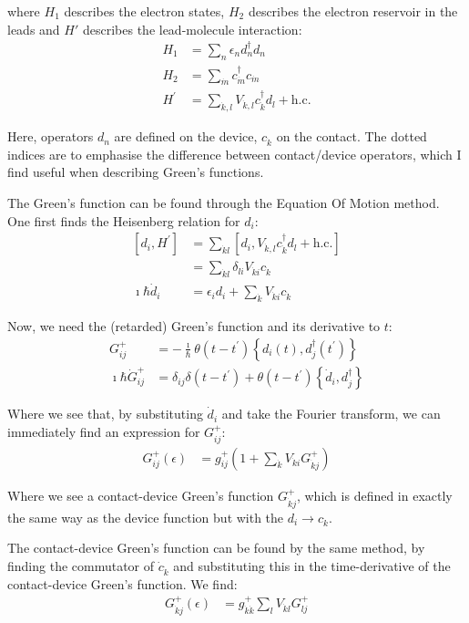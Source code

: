 where $H_1$ describes the electron states, $H_2$ describes the electron reservoir in the leads and $H'$ describes the lead-molecule interaction:
\begin{align*}
H_1 &= \sum_n \epsilon_n d^\dagger_n d_n \\
H_2 &= \sum_{\dot{m}} c^\dagger_{\dot{m}} c_{\dot{m}} \\
H^\prime &= \sum_{\dot{k}, l} V_{\dot{k}, l} c^\dagger_{\dot{k}} d_l + \text{h.c.}
\end{align*}

Here, operators $d_n$ are defined on the device, $c_{\dot{k}}$ on the contact. The dotted indices are to emphasise the difference between contact/device operators, which I find useful when describing Green's functions. 

The Green's function can be found through the Equation Of Motion method. One first finds the Heisenberg relation for $d_i$:
\begin{align*}
\left[ d_i, H^\prime\right] &= \sum_{\dot{k}l}\left[d_i, V_{\dot{k}, l} c^\dagger_{\dot{k}} d_l + \text{h.c.}\right] \\
&= \sum_{\dot{k}l}\delta_{li} V_{\dot{k}i} c_{\dot{k}}\\
\imath\hbar \dot{d}_i &= \epsilon_i d_i + \sum_{\dot{k}}V_{\dot{k}i} c_{\dot{k}}
\end{align*}

Now, we need the (retarded) Green's function and its derivative to $t$:
\begin{align*}
G_{ij}^+ &= - \frac{\imath}{\hbar} \theta(t-t^\prime) \left\{ d_i(t), d_j^\dagger(t^\prime) \right\} \\
\imath\hbar \dot{G}_{ij}^+ &= \delta_{ij} \delta(t - t^\prime) + \theta(t-t^\prime) \left\{ \dot{d}_i, d_j^\dagger\right\}
\end{align*}

Where we see that, by substituting $\dot{d}_i$ and take the Fourier transform, we can immediately find an expression for $G_{ij}^+$:
\begin{align*} 
G_{ij}^+ (\epsilon) &= g_{ij}^+ \left( 1 + \sum_{\dot{k}} V_{\dot{k}i} G_{\dot{k}j}^+ \right)
\end{align*}

Where we see a contact-device Green's function $G_{\dot{k}j}^+$, which is defined in exactly the same way as the device function but with the $d_i \rightarrow c_{\dot{k}}$.

The contact-device Green's function can be found by the same method, by finding the commutator of $\dot{c}_{\dot{k}}$ and substituting this in the time-derivative of the contact-device Green's function. We find:
\begin{align*}
G_{\dot{k}j}^+ (\epsilon) &= g_{\dot{k}\dot{k}}^+ \sum_l V_{\dot{k}l} G_{lj}^+
\end{align*}

